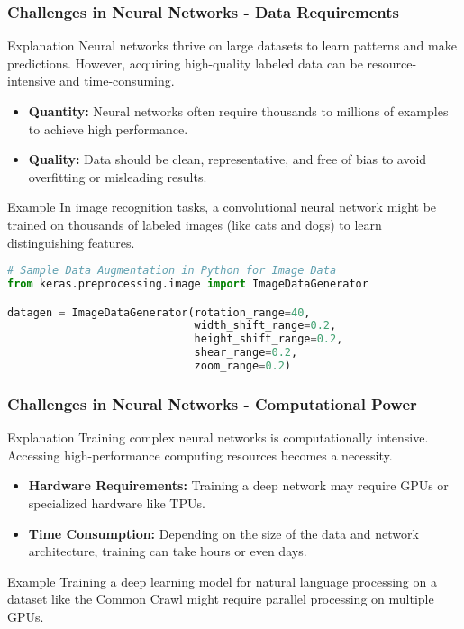 \documentclass[aspectratio=169]{beamer}
\begin{document}
\begin{frame}[fragile]
    \frametitle{Challenges in Neural Networks - Data Requirements}
    \begin{block}{Explanation}
        Neural networks thrive on large datasets to learn patterns and make predictions. However, acquiring high-quality labeled data can be resource-intensive and time-consuming.
    \end{block}
    
    \begin{itemize}
        \item \textbf{Quantity:} Neural networks often require thousands to millions of examples to achieve high performance.
        \item \textbf{Quality:} Data should be clean, representative, and free of bias to avoid overfitting or misleading results.
    \end{itemize}
    
    \begin{block}{Example}
        In image recognition tasks, a convolutional neural network might be trained on thousands of labeled images (like cats and dogs) to learn distinguishing features.
    \end{block}
    
    \begin{lstlisting}[language=Python]
# Sample Data Augmentation in Python for Image Data
from keras.preprocessing.image import ImageDataGenerator

datagen = ImageDataGenerator(rotation_range=40, 
                             width_shift_range=0.2, 
                             height_shift_range=0.2, 
                             shear_range=0.2, 
                             zoom_range=0.2)
    \end{lstlisting}
\end{frame}

\begin{frame}[fragile]
    \frametitle{Challenges in Neural Networks - Computational Power}
    \begin{block}{Explanation}
        Training complex neural networks is computationally intensive. Accessing high-performance computing resources becomes a necessity.
    \end{block}
    
    \begin{itemize}
        \item \textbf{Hardware Requirements:} Training a deep network may require GPUs or specialized hardware like TPUs.
        \item \textbf{Time Consumption:} Depending on the size of the data and network architecture, training can take hours or even days.
    \end{itemize}
    
    \begin{block}{Example}
        Training a deep learning model for natural language processing on a dataset like the Common Crawl might require parallel processing on multiple GPUs.
    \end{block}
\end{frame}
\end{document}
